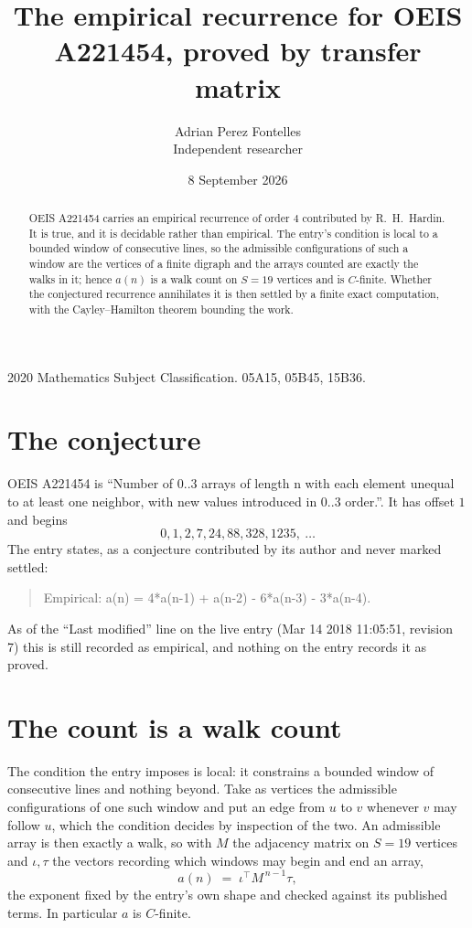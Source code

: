 \documentclass[11pt,a4paper]{article}
\title{The empirical recurrence for OEIS A221454, proved by transfer matrix}
\author{Adrian Perez Fontelles\\ \small Independent researcher}
\date{8 September 2026}
\theoremstyle{plain}
\theoremstyle{definition}
\begin{document}
\maketitle

\begin{abstract}
OEIS A221454 carries an empirical recurrence of order $4$ contributed by R.~H.~Hardin. It is
true, and it is decidable rather than empirical. The entry's condition is local to a bounded window of consecutive lines, so
the admissible configurations of such a window are the vertices of a finite digraph and the
arrays counted are exactly the walks in it; hence $a(n)$ is a walk count on $S=19$ vertices
and is $C$-finite. Whether the conjectured recurrence annihilates it is then settled by a
finite exact computation, with the Cayley--Hamilton theorem bounding the work.
\end{abstract}

\noindent\small 2020 Mathematics Subject Classification. 05A15, 05B45, 15B36.\normalsize

\section{The conjecture}

OEIS A221454 is ``Number of 0..3 arrays of length n with each element unequal to at least one neighbor, with new values introduced in 0..3 order.''. It has offset $1$ and begins
\[
0, 1, 2, 7, 24, 88, 328, 1235,\ \dots
\]
The entry states, as a conjecture contributed by its author and never marked settled:
\begin{quote}
Empirical: a(n) = 4*a(n-1) + a(n-2) - 6*a(n-3) - 3*a(n-4).
\end{quote}
As of the ``Last modified'' line on the live entry (Mar 14 2018 11:05:51, revision 7) this is still
recorded as empirical, and nothing on the entry records it as proved.

\section{The count is a walk count}

The condition the entry imposes is local: it constrains a bounded window of consecutive lines and nothing beyond. Take as
vertices the admissible configurations of one such window and put an edge from $u$ to $v$
whenever $v$ may follow $u$, which the condition decides by inspection of the two. An
admissible array is then exactly a walk, so with $M$ the adjacency matrix on $S=19$ vertices
and $\iota,\tau$ the vectors recording which windows may begin and end an array,
\[
a(n)\;=\;\iota^{\!\top}M^{\,n-1}\tau ,
\]
the exponent fixed by the entry's own shape and checked against its published terms. In
particular $a$ is $C$-finite.
\end{document}
